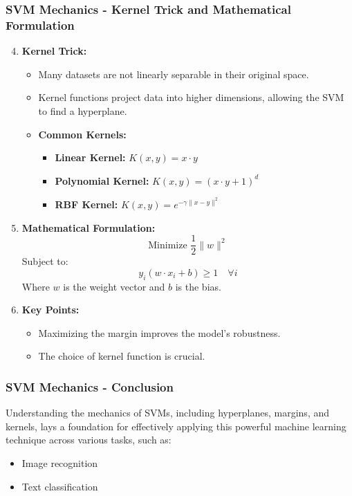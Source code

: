 \documentclass[aspectratio=169]{beamer}
\begin{document}
\begin{frame}[fragile]
  \frametitle{SVM Mechanics - Kernel Trick and Mathematical Formulation}
  \begin{enumerate}
    \setcounter{enumi}{3}
    \item \textbf{Kernel Trick:}
      \begin{itemize}
        \item Many datasets are not linearly separable in their original space.
        \item Kernel functions project data into higher dimensions, allowing the SVM to find a hyperplane.
        \item \textbf{Common Kernels:}
          \begin{itemize}
            \item \textbf{Linear Kernel:} \( K(x, y) = x \cdot y \)
            \item \textbf{Polynomial Kernel:} \( K(x, y) = (x \cdot y + 1)^d \)
            \item \textbf{RBF Kernel:} \( K(x, y) = e^{-\gamma \|x - y\|^2} \)
          \end{itemize}
      \end{itemize}
    
    \item \textbf{Mathematical Formulation:}
      \begin{equation}
        \text{Minimize } \frac{1}{2} \|w\|^2
      \end{equation}
      Subject to:
      \begin{equation}
        y_i(w \cdot x_i + b) \geq 1 \quad \forall i
      \end{equation}
      Where \( w \) is the weight vector and \( b \) is the bias.
    
    \item \textbf{Key Points:}
      \begin{itemize}
        \item Maximizing the margin improves the model's robustness.
        \item The choice of kernel function is crucial.
      \end{itemize}
  \end{enumerate}
\end{frame}

\begin{frame}[fragile]
  \frametitle{SVM Mechanics - Conclusion}
  Understanding the mechanics of SVMs, including hyperplanes, margins, and kernels, lays a foundation for effectively applying this powerful machine learning technique across various tasks, such as:
  \begin{itemize}
    \item Image recognition
    \item Text classification
  \end{itemize}
\end{frame}
\end{document}
